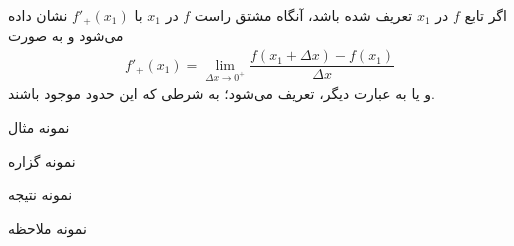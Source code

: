 اگر تابع $f$ در $x_1$ تعریف شده باشد، آنگاه مشتق راست $f$ در $x_1$ با $f'_{+}(x_1)$ 
نشان داده می‌شود و به صورت 
\begin{align}
f'_{+}(x_1)=\lim_{\Delta x\rightarrow 0^{+}}\dfrac{f(x_1+\Delta x) - f(x_1)}{\Delta x}
\end{align}
و یا به عبارت دیگر،
تعریف می‌شود؛ به شرطی که این حدود موجود باشند.

\begin{example}
نمونه مثال
\end{example}
\begin{proposition}
نمونه گزاره
\end{proposition}
\begin{corollary}
نمونه نتیجه
\end{corollary}

\begin{remark}
نمونه ملاحظه
\end{remark}


